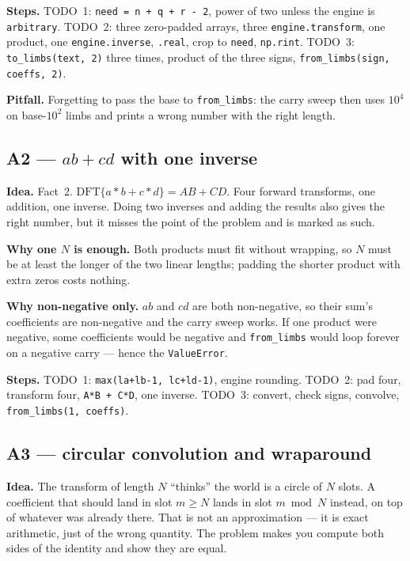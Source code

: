 \documentclass[11pt]{article}
\newcommand{\code}[1]{\texttt{#1}}
\begin{document}
\textbf{Steps.} TODO~1: \code{need = n + q + r - 2}, power of two unless the
engine is \code{arbitrary}. TODO~2: three zero-padded arrays, three
\code{engine.transform}, one product, one \code{engine.inverse}, \code{.real},
crop to \code{need}, \code{np.rint}. TODO~3: \code{to\_limbs(text, 2)} three
times, product of the three signs, \code{from\_limbs(sign, coeffs, 2)}.

\textbf{Pitfall.} Forgetting to pass the base to \code{from\_limbs}: the
carry sweep then uses $10^4$ on base-$10^2$ limbs and prints a wrong number
with the right length.

\subsection*{A2 --- $ab + cd$ with one inverse}

\textbf{Idea.} Fact~2. $\mathrm{DFT}\{a*b + c*d\} = AB + CD$. Four forward
transforms, one addition, one inverse. Doing two inverses and adding the
results also gives the right number, but it misses the point of the problem
and is marked as such.

\textbf{Why one $N$ is enough.} Both products must fit without wrapping, so
$N$ must be at least the longer of the two linear lengths; padding the shorter
product with extra zeros costs nothing.

\textbf{Why non-negative only.} $ab$ and $cd$ are both non-negative, so their
sum's coefficients are non-negative and the carry sweep works. If one product
were negative, some coefficients would be negative and \code{from\_limbs}
would loop forever on a negative carry --- hence the \code{ValueError}.

\textbf{Steps.} TODO~1: \code{max(la+lb-1, lc+ld-1)}, engine rounding.
TODO~2: pad four, transform four, \code{A*B + C*D}, one inverse.
TODO~3: convert, check signs, convolve, \code{from\_limbs(1, coeffs)}.

\subsection*{A3 --- circular convolution and wraparound}

\textbf{Idea.} The transform of length $N$ ``thinks'' the world is a circle of
$N$ slots. A coefficient that should land in slot $m \ge N$ lands in slot
$m \bmod N$ instead, on top of whatever was already there. That is not an
approximation --- it is exact arithmetic, just of the wrong quantity. The
problem makes you compute both sides of the identity and show they are equal.
\end{document}
